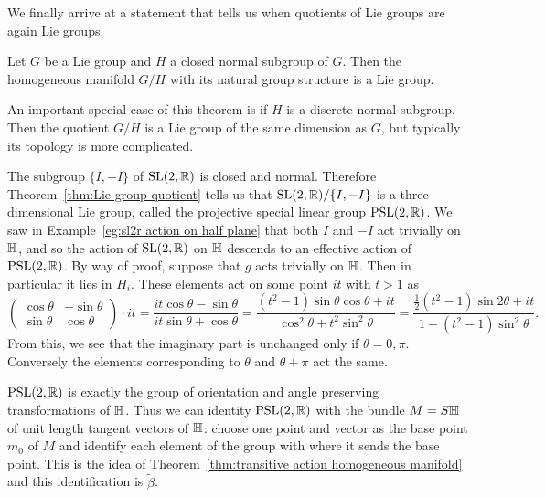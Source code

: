 We finally arrive at a statement that tells us when quotients of Lie groups are again Lie groups.

\begin{theorem}
\label{thm:Lie group quotient}
Let $G$ be a Lie group and $H$ a closed normal subgroup of $G$. Then the homogeneous manifold $G/H$ with its natural group structure is a Lie group.
\end{theorem}

An important special case of this theorem is if $H$ is a discrete normal subgroup.
Then the quotient $G/H$ is a Lie group of the same dimension as $G$, but typically its topology is more complicated.

\begin{example}
\label{eg:psl2r}
The subgroup $\{I,-I\}$ of $\mathrm{SL}(2,\mathbb{R})$ is closed and normal.
Therefore Theorem~\ref{thm:Lie group quotient} tells us that $\mathrm{SL}(2,\mathbb{R})/ \{I,-I\}$ is a three dimensional Lie group, called the projective special linear group $\mathrm{PSL}(2,\mathbb{R})$.
We saw in Example~\ref{eg:sl2r action on half plane} that both $I$ and $-I$ act trivially on $\mathbb{H}$, and so the action of $\mathrm{SL}(2,\mathbb{R})$ on $\mathbb{H}$ descends to an effective action of $\mathrm{PSL}(2,\mathbb{R})$.
By way of proof, suppose that $g$ acts trivially on $\mathbb{H}$.
Then in particular it lies in $H_i$.
These elements act on some point $it$ with $t>1$ as 
\[
\begin{pmatrix}
\cos\theta & -\sin\theta \\ \sin\theta & \cos\theta
\end{pmatrix} \cdot it
= \frac{it \cos\theta - \sin\theta}{it \sin\theta + \cos\theta}
= \frac{(t^2-1) \sin\theta\cos\theta + it}{\cos^2\theta + t^2 \sin^2\theta}
= \frac{\tfrac{1}{2}(t^2-1) \sin2\theta + it}{1 + (t^2-1) \sin^2\theta}.
\]
From this, we see that the imaginary part is unchanged only if $\theta = 0,\pi$.
Conversely the elements corresponding to $\theta$ and $\theta + \pi$ act the same. 

$\mathrm{PSL}(2,\mathbb{R})$ is exactly the group of orientation and angle preserving transformations of $\mathbb{H}$.
Thus we can identity $\mathrm{PSL}(2,\mathbb{R})$ with the bundle $M = S\mathbb{H}$ of unit length tangent vectors of $\mathbb{H}$: choose one point and vector as the base point $m_0$ of $M$ and identify each element of the group with where it sends the base point.
This is the idea of Theorem~\ref{thm:transitive action homogeneous manifold} and this identification is $\tilde{\beta}$.
\end{example}

